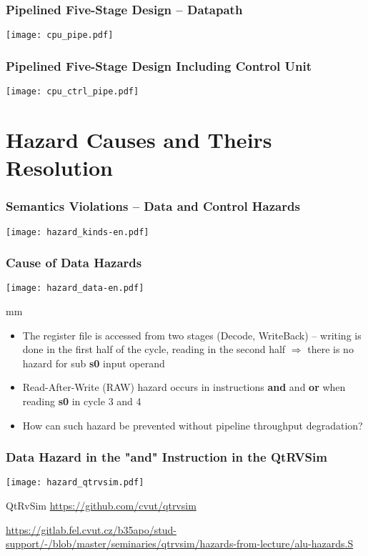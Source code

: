 \documentclass{beamer}
\begin{document}
\begin{frame}
\frametitle{Pipelined Five-Stage Design -- Datapath}
\texttt{[image: cpu\_pipe.pdf]}
\end{frame}

\begin{frame}
\frametitle{Pipelined Five-Stage Design Including Control Unit}
\texttt{[image: cpu\_ctrl\_pipe.pdf]}
\end{frame}

\section{Hazard Causes and Theirs Resolution}

\begin{frame}
\frametitle{Semantics Violations -- Data and Control Hazards}
\texttt{[image: hazard\_kinds-en.pdf]}
\end{frame}

\begin{frame}
\frametitle{Cause of Data Hazards}
\texttt{[image: hazard\_data-en.pdf]}

 mm

\begin{itemize}
 \item The register file is accessed from two stages (Decode, WriteBack) --
       writing is done in the first half of the cycle, reading in the second half $\Rightarrow$ there is no hazard for sub \textbf{s0} input operand
 \item Read-After-Write (RAW) hazard occurs in instructions
       \textbf{and} and \textbf{or} when reading \textbf{s0} in cycle 3 and 4
 \item How can such hazard be prevented without pipeline throughput degradation?
\end{itemize}

\end{frame}


\begin{frame}
\frametitle{Data Hazard in the "and" Instruction in the QtRVSim}
\texttt{[image: hazard\_qtrvsim.pdf]}

{\tiny
QtRvSim \url{https://github.com/cvut/qtrvsim}
}

{\Tiny
\url{https://gitlab.fel.cvut.cz/b35apo/stud-support/-/blob/master/seminaries/qtrvsim/hazards-from-lecture/alu-hazards.S}
}

\end{frame}
\end{document}
